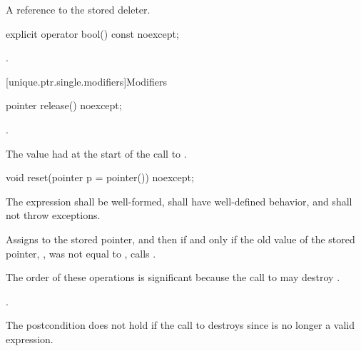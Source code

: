 \begin{itemdescr}
\pnum
\returns
A reference to the stored deleter.
\end{itemdescr}

%
\begin{itemdecl}
explicit operator bool() const noexcept;
\end{itemdecl}

\begin{itemdescr}
\pnum
\returns
{}.
\end{itemdescr}

[unique.ptr.single.modifiers]{Modifiers}

%
\begin{itemdecl}
pointer release() noexcept;
\end{itemdecl}

\begin{itemdescr}
\pnum
\ensures
{}.

\pnum
\returns
The value  had at the start of
the call to .
\end{itemdescr}

%
\begin{itemdecl}
void reset(pointer p = pointer()) noexcept;
\end{itemdecl}

\begin{itemdescr}
\pnum
\requires The expression  shall be well-formed, shall have
well-defined behavior, and shall not throw exceptions.

\pnum
\effects
Assigns  to the stored pointer, and then if and only if the old value of the
stored pointer, , was not equal to , calls
.
\begin{note}
The order of these operations is significant
because the call to  may destroy .
\end{note}

\pnum
\ensures
{}.
\begin{note}
The postcondition does not hold if the call to 
destroys  since  is no longer a valid expression.
\end{note}
\end{itemdescr}

